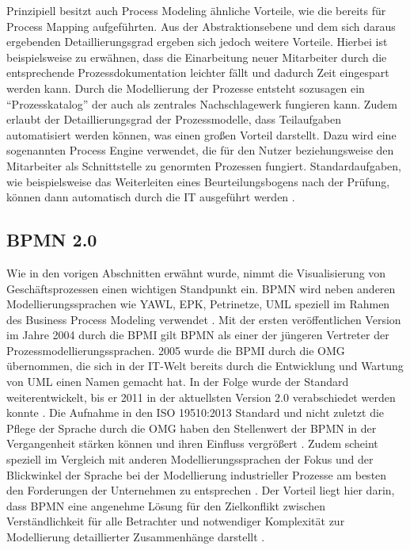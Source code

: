 \documentclass[a4paper,12pt]{report}
\begin{document}
Prinzipiell besitzt auch Process Modeling ähnliche Vorteile, wie die bereits für Process Mapping aufgeführten. Aus der Abstraktionsebene und dem sich daraus ergebenden Detaillierungsgrad ergeben sich jedoch weitere Vorteile. Hierbei ist beispielsweise zu erwähnen, dass die Einarbeitung neuer Mitarbeiter durch die entsprechende Prozessdokumentation leichter fällt und dadurch Zeit eingespart werden kann. Durch die Modellierung der Prozesse entsteht sozusagen ein "`Prozesskatalog"' der auch als zentrales Nachschlagewerk fungieren kann. Zudem erlaubt der Detaillierungsgrad der Prozessmodelle, dass Teilaufgaben automatisiert werden können, was einen großen Vorteil darstellt. Dazu wird eine sogenannten Process Engine verwendet, die für den Nutzer beziehungsweise den Mitarbeiter als Schnittstelle zu genormten Prozessen fungiert. Standardaufgaben, wie beispielsweise das Weiterleiten eines Beurteilungsbogens nach der Prüfung, können dann automatisch durch die \ac{IT} ausgeführt werden \citep[vgl.][S. 2-8]{Freund2014}.

\subsection{BPMN 2.0}\label{subsec:BPMN}
Wie in den vorigen Abschnitten erwähnt wurde, nimmt die Visualisierung von Geschäftsprozessen einen wichtigen Standpunkt ein. \ac{BPMN} wird neben anderen Modellierungssprachen wie YAWL, EPK, Petrinetze, UML speziell im Rahmen des Business Process Modeling verwendet \cite[vgl.][S. 9]{Kossak2014}. Mit der ersten veröffentlichen Version im Jahre 2004 durch die \ac{BPMI} gilt BPMN als einer der jüngeren Vertreter der Prozessmodellierungssprachen. 2005 wurde die \ac{BPMI} durch die \ac{OMG} übernommen, die sich in der IT-Welt bereits durch die Entwicklung und Wartung von UML einen Namen gemacht hat. In der Folge wurde der Standard weiterentwickelt, bis er 2011 in der aktuellsten Version 2.0 verabschiedet werden konnte \citep[vgl.][S. 8f.]{Freund2014}. Die Aufnahme in den ISO 19510:2013 Standard und nicht zuletzt die Pflege der Sprache durch die OMG haben den Stellenwert der BPMN in der Vergangenheit stärken können und ihren Einfluss vergrößert \cite[vgl.][S.10f.]{Kossak2014}. Zudem scheint speziell im Vergleich mit anderen Modellierungssprachen der Fokus und der Blickwinkel der Sprache bei der Modellierung industrieller Prozesse am besten den Forderungen der Unternehmen zu entsprechen \cite[vgl.][S.16]{Kossak2014}. Der Vorteil liegt hier darin, dass BPMN eine angenehme Lösung für den Zielkonflikt zwischen Verständlichkeit für alle Betrachter und notwendiger Komplexität zur Modellierung detaillierter Zusammenhänge darstellt \citep[vgl.][S. 11f.]{Freund2014}.
\end{document}
